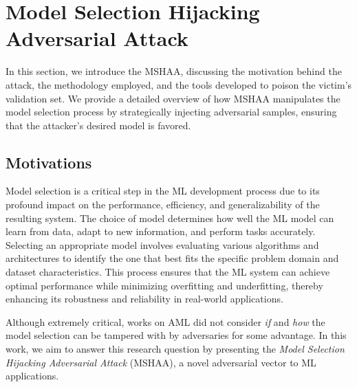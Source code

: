 \section{Model Selection Hijacking Adversarial Attack}
In this section, we introduce the MSHAA, discussing the motivation behind the attack, the methodology employed, and the tools developed to poison the victim’s validation set. We provide a detailed overview of how MSHAA manipulates the model selection process by strategically injecting adversarial samples, ensuring that the attacker's desired model is favored.
\subsection{Motivations}
Model selection is a critical step in the ML 
development process due to its profound impact on the performance, efficiency, and generalizability of the resulting system. The choice of model determines how well the 
ML model can learn from data, adapt to new information, and perform tasks accurately. Selecting an appropriate model involves evaluating various algorithms and architectures to identify the one that best fits the specific problem domain and dataset characteristics. This process ensures that the ML system can achieve optimal performance while minimizing overfitting and underfitting, thereby enhancing its robustness and reliability in real-world applications.
\par
Although extremely critical, works on AML did not consider \textit{if} and \textit{how} the model selection can be tampered with by adversaries for some advantage.  
In this work, we aim to answer this research question by presenting the \textit{Model Selection Hijacking Adversarial Attack} (MSHAA), a novel adversarial vector to ML applications. 
%
